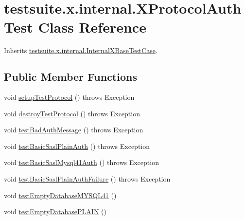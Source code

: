 \hypertarget{classtestsuite_1_1x_1_1internal_1_1_x_protocol_auth_test}{}\section{testsuite.\+x.\+internal.\+X\+Protocol\+Auth\+Test Class Reference}
\label{classtestsuite_1_1x_1_1internal_1_1_x_protocol_auth_test}


Inherits \mbox{\hyperlink{classtestsuite_1_1x_1_1internal_1_1_internal_x_base_test_case}{testsuite.\+x.\+internal.\+Internal\+X\+Base\+Test\+Case}}.

\subsection*{Public Member Functions}
\begin{DoxyCompactItemize}
\item 
void \mbox{\hyperlink{classtestsuite_1_1x_1_1internal_1_1_x_protocol_auth_test_a57430feba87ab0193bb09121d9ad49a6}{setup\+Test\+Protocol}} ()  throws Exception 
\item 
void \mbox{\hyperlink{classtestsuite_1_1x_1_1internal_1_1_x_protocol_auth_test_a18ba2416ae6c99ffb77b8365f9555a0d}{destroy\+Test\+Protocol}} ()  throws Exception 
\item 
void \mbox{\hyperlink{classtestsuite_1_1x_1_1internal_1_1_x_protocol_auth_test_a15c56d0e66e32bb2906ca10e99e87aef}{test\+Bad\+Auth\+Message}} ()  throws Exception 
\item 
void \mbox{\hyperlink{classtestsuite_1_1x_1_1internal_1_1_x_protocol_auth_test_a535fb0dc31d27ef08facfe31f5969523}{test\+Basic\+Sasl\+Plain\+Auth}} ()  throws Exception 
\item 
void \mbox{\hyperlink{classtestsuite_1_1x_1_1internal_1_1_x_protocol_auth_test_a7b4ee549a5e581fda55eb659d75909b5}{test\+Basic\+Sasl\+Mysql41\+Auth}} ()  throws Exception 
\item 
void \mbox{\hyperlink{classtestsuite_1_1x_1_1internal_1_1_x_protocol_auth_test_a502f91ff41c06ef067fa9845718fe7f5}{test\+Basic\+Sasl\+Plain\+Auth\+Failure}} ()  throws Exception 
\item 
void \mbox{\hyperlink{classtestsuite_1_1x_1_1internal_1_1_x_protocol_auth_test_a76e75605e16d62562cc640dee2c1f97f}{test\+Empty\+Database\+M\+Y\+S\+Q\+L41}} ()
\item 
void \mbox{\hyperlink{classtestsuite_1_1x_1_1internal_1_1_x_protocol_auth_test_a0399a6526726159d237bed0441d195c2}{test\+Empty\+Database\+P\+L\+A\+IN}} ()
\end{DoxyCompactItemize}

